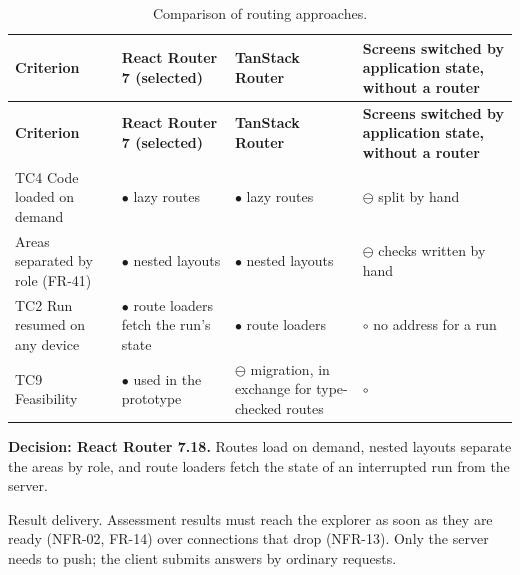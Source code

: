 {\small
\begin{longtable}{|>{\raggedright\arraybackslash}p{}|>{\raggedright\arraybackslash}p{}|>{\raggedright\arraybackslash}p{}|>{\raggedright\arraybackslash}p{}|}
\caption{Comparison of routing approaches.} \\
\hline
\textbf{Criterion} & \textbf{React Router 7 (selected)} & \textbf{TanStack Router\cite{r175}} & \textbf{Screens switched by application state, without a router} \\ \hline
\endfirsthead
\hline
\textbf{Criterion} & \textbf{React Router 7 (selected)} & \textbf{TanStack Router\cite{r175}} & \textbf{Screens switched by application state, without a router} \\ \hline
\endhead
TC4 Code loaded on demand & $\bullet$ lazy routes & $\bullet$ lazy routes & $\ominus$ split by hand \\ \hline
Areas separated by role (FR-41) & $\bullet$ nested layouts & $\bullet$ nested layouts & $\ominus$ checks written by hand \\ \hline
TC2 Run resumed on any device & $\bullet$ route loaders fetch the run's state\cite{r143} & $\bullet$ route loaders & $\circ$ no address for a run \\ \hline
TC9 Feasibility & $\bullet$ used in the prototype & $\ominus$ migration, in exchange for type-checked routes & $\circ$ \\ \hline
\end{longtable}
}

\textbf{Decision: React Router 7.18.} Routes load on demand, nested layouts separate the areas by role, and route loaders fetch the state of an interrupted run from the server\cite{r143}.

Result delivery. Assessment results must reach the explorer as soon as they are ready (NFR-02, FR-14) over connections that drop (NFR-13). Only the server needs to push; the client submits answers by ordinary requests.

